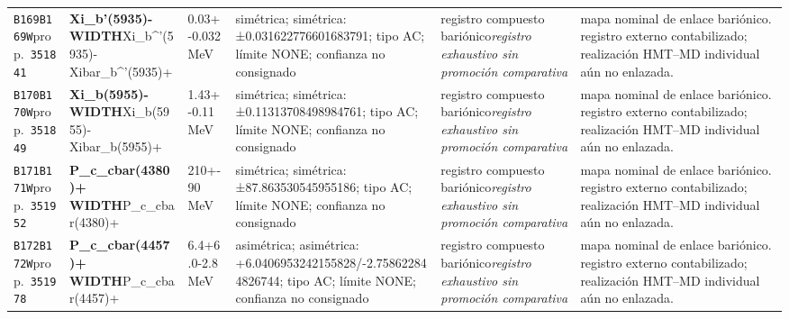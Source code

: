 \begin{landscape}
\begin{longtable}{L{1.85cm}L{4.45cm}L{2.35cm}L{4.05cm}L{3.35cm}L{7.15cm}}
\texttt{B169}\newline \texttt{B169W}\newline prop.\ \texttt{351841} & \textbf{Xi\_\allowbreak{}b'(5935)- WIDTH}\newline Xi\_\allowbreak{}b\textasciicircum{}'(5935)- \textbar{}\allowbreak{} Xibar\_\allowbreak{}b\textasciicircum{}'(5935)+ & 0.03+-0.032\,MeV & simétrica; simétrica: ±0.031622776601683791; tipo AC; límite NONE; confianza no consignado & registro compuesto bariónico\newline \emph{registro exhaustivo sin promoción comparativa} & mapa nominal de enlace bariónico. registro externo contabilizado; realización HMT--MD individual aún no enlazada. \\
\texttt{B170}\newline \texttt{B170W}\newline prop.\ \texttt{351849} & \textbf{Xi\_\allowbreak{}b(5955)- WIDTH}\newline Xi\_\allowbreak{}b(5955)- \textbar{}\allowbreak{} Xibar\_\allowbreak{}b(5955)+ & 1.43+-0.11\,MeV & simétrica; simétrica: ±0.11313708498984761; tipo AC; límite NONE; confianza no consignado & registro compuesto bariónico\newline \emph{registro exhaustivo sin promoción comparativa} & mapa nominal de enlace bariónico. registro externo contabilizado; realización HMT--MD individual aún no enlazada. \\
\texttt{B171}\newline \texttt{B171W}\newline prop.\ \texttt{351952} & \textbf{P\_\allowbreak{}c\_\allowbreak{}cbar(4380)+ WIDTH}\newline P\_\allowbreak{}c\_\allowbreak{}cbar(4380)+ & 210+-90\,MeV & simétrica; simétrica: ±87.863530545955186; tipo AC; límite NONE; confianza no consignado & registro compuesto bariónico\newline \emph{registro exhaustivo sin promoción comparativa} & mapa nominal de enlace bariónico. registro externo contabilizado; realización HMT--MD individual aún no enlazada. \\
\texttt{B172}\newline \texttt{B172W}\newline prop.\ \texttt{351978} & \textbf{P\_\allowbreak{}c\_\allowbreak{}cbar(4457)+ WIDTH}\newline P\_\allowbreak{}c\_\allowbreak{}cbar(4457)+ & 6.4+6.0-2.8\,MeV & asimétrica; asimétrica: +6.0406953242155828/-2.758622844826744; tipo AC; límite NONE; confianza no consignado & registro compuesto bariónico\newline \emph{registro exhaustivo sin promoción comparativa} & mapa nominal de enlace bariónico. registro externo contabilizado; realización HMT--MD individual aún no enlazada. \\

\end{longtable}
\end{landscape}
